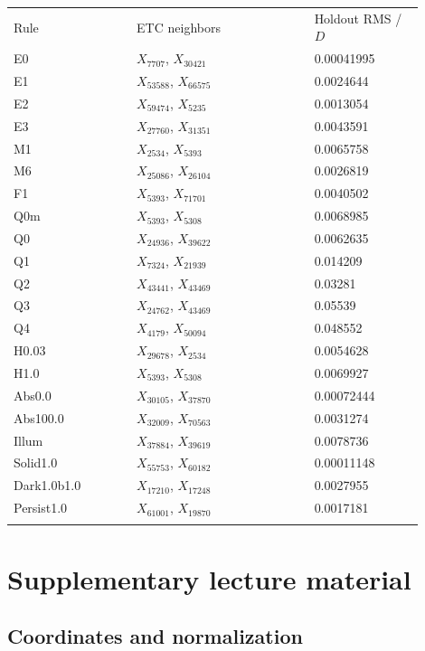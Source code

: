 \documentclass[11pt,oneside,openany]{book}
\newcommand{\toprule}{\hline\noalign{\vskip4pt}}
\newcommand{\midrule}{\noalign{\vskip3pt}\hline\noalign{\vskip4pt}}
\newcommand{\bottomrule}{\noalign{\vskip3pt}\hline}
\begin{document}
\begin{center}\small\begin{tabular}{p{0.27\linewidth}p{0.39\linewidth}p{0.24\linewidth}}\toprule
Rule & ETC neighbors & Holdout RMS / $D$\\\midrule
E0 & $X_{7707}$, $X_{30421}$ & 0.00041995\\
E1 & $X_{53588}$, $X_{66575}$ & 0.0024644\\
E2 & $X_{59474}$, $X_{5235}$ & 0.0013054\\
E3 & $X_{27760}$, $X_{31351}$ & 0.0043591\\
M1 & $X_{2534}$, $X_{5393}$ & 0.0065758\\
M6 & $X_{25086}$, $X_{26104}$ & 0.0026819\\
F1 & $X_{5393}$, $X_{71701}$ & 0.0040502\\
$\mathrm{Q0m}$ & $X_{5393}$, $X_{5308}$ & 0.0068985\\
$\mathrm{Q0}$ & $X_{24936}$, $X_{39622}$ & 0.0062635\\
Q1 & $X_{7324}$, $X_{21939}$ & 0.014209\\
Q2 & $X_{43441}$, $X_{43469}$ & 0.03281\\
Q3 & $X_{24762}$, $X_{43469}$ & 0.05539\\
Q4 & $X_{4179}$, $X_{50094}$ & 0.048552\\
H0.03 & $X_{29678}$, $X_{2534}$ & 0.0054628\\
H1.0 & $X_{5393}$, $X_{5308}$ & 0.0069927\\
Abs0.0 & $X_{30105}$, $X_{37870}$ & 0.00072444\\
Abs100.0 & $X_{32009}$, $X_{70563}$ & 0.0031274\\
Illum & $X_{37884}$, $X_{39619}$ & 0.0078736\\
Solid1.0 & $X_{55753}$, $X_{60182}$ & 0.00011148\\
Dark1.0b1.0 & $X_{17210}$, $X_{17248}$ & 0.0027955\\
Persist1.0 & $X_{61001}$, $X_{19870}$ & 0.0017181\\\bottomrule\end{tabular}\end{center}

\chapter{Supplementary lecture material}\label{app:supplement}

\section{Coordinates and normalization}\label{sec:slide91}
\end{document}
